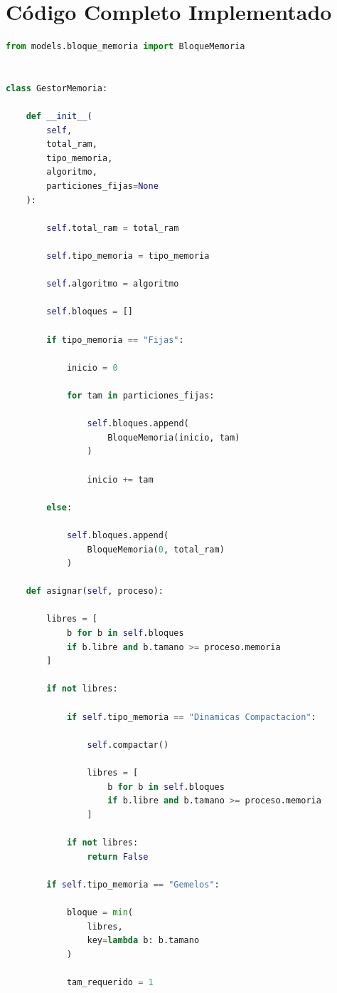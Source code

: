\section{Código Completo Implementado}

\begin{lstlisting}[language=Python]
from models.bloque_memoria import BloqueMemoria


class GestorMemoria:

    def __init__(
        self,
        total_ram,
        tipo_memoria,
        algoritmo,
        particiones_fijas=None
    ):

        self.total_ram = total_ram

        self.tipo_memoria = tipo_memoria

        self.algoritmo = algoritmo

        self.bloques = []

        if tipo_memoria == "Fijas":

            inicio = 0

            for tam in particiones_fijas:

                self.bloques.append(
                    BloqueMemoria(inicio, tam)
                )

                inicio += tam

        else:

            self.bloques.append(
                BloqueMemoria(0, total_ram)
            )

    def asignar(self, proceso):

        libres = [
            b for b in self.bloques
            if b.libre and b.tamano >= proceso.memoria
        ]

        if not libres:

            if self.tipo_memoria == "Dinamicas Compactacion":

                self.compactar()

                libres = [
                    b for b in self.bloques
                    if b.libre and b.tamano >= proceso.memoria
                ]

            if not libres:
                return False

        if self.tipo_memoria == "Gemelos":

            bloque = min(
                libres,
                key=lambda b: b.tamano
            )

            tam_requerido = 1


\end{lstlisting}
